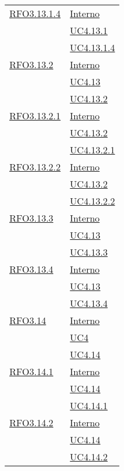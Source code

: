 \begin{longtable}{|>{\centering}m{5cm}|m{5cm}<{\centering}|}
\hyperlink{RFO3.13.1.4}{RFO3.13.1.4} &  \hyperlink{Interno}{Interno}\\ &\hyperref[UC4.13.1]{UC4.13.1}\\ &\hyperref[UC4.13.1.4]{UC4.13.1.4}\\ \hline

\hyperlink{RFO3.13.2}{RFO3.13.2} & \hyperlink{Interno}{Interno}\\ &\hyperref[UC4.13]{UC4.13}\\ &\hyperref[UC4.13.2]{UC4.13.2}\\ \hline

\hyperlink{RFO3.13.2.1}{RFO3.13.2.1} &  \hyperlink{Interno}{Interno}\\ &\hyperref[UC4.13.2]{UC4.13.2}\\ &\hyperref[UC4.13.2.1]{UC4.13.2.1}\\ \hline

\hyperlink{RFO3.13.2.2}{RFO3.13.2.2} &  \hyperlink{Interno}{Interno}\\ &\hyperref[UC4.13.2]{UC4.13.2}\\ &\hyperref[UC4.13.2.2]{UC4.13.2.2}\\ \hline

\hyperlink{RFO3.13.3}{RFO3.13.3} & \hyperlink{Interno}{Interno}\\ &\hyperref[UC4.13]{UC4.13}\\ &\hyperref[UC4.13.3]{UC4.13.3}\\ \hline

\hyperlink{RFO3.13.4}{RFO3.13.4} &  \hyperlink{Interno}{Interno}\\ &\hyperref[UC4.13]{UC4.13}\\ &\hyperref[UC4.13.4]{UC4.13.4}\\ \hline

\hyperlink{RFO3.14}{RFO3.14} & \hyperlink{Interno}{Interno}\\ &\hyperref[UC4]{UC4}\\ &\hyperref[UC4.14]{UC4.14}\\ \hline

\hyperlink{RFO3.14.1}{RFO3.14.1} &  \hyperlink{Interno}{Interno}\\ &\hyperref[UC4.14]{UC4.14}\\ &\hyperref[UC4.14.1]{UC4.14.1}\\ \hline

\hyperlink{RFO3.14.2}{RFO3.14.2} &   \hyperlink{Interno}{Interno}\\ &\hyperref[UC4.14]{UC4.14}\\ &\hyperref[UC4.14.2]{UC4.14.2}\\ \hline


\end{longtable}
